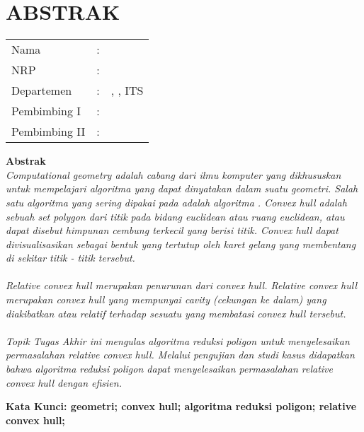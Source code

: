 \chapter {ABSTRAK}


\noindent\textbf{\MakeUppercase\judul}
\vspace*{1em}

\begin{tabularx}{\linewidth}{ l l p{2.2in} }
	Nama 			& : & \penulis \\
	NRP 			& :	& \nrp \\
	Departemen 		& : & \jurusan, \newline \fakultas, ITS \\
	Pembimbing I 	& : & \pembimbingsatu \\
	Pembimbing II 	& : & \pembimbingdua
	\vspace*{1em} 	%
\end {tabularx}

\noindent\textbf{Abstrak} \\
\itshape
\textit{Computational geometry} adalah cabang dari ilmu komputer yang dikhususkan untuk mempelajari algoritma yang dapat dinyatakan dalam suatu geometri. Salah satu algoritma yang sering dipakai pada \CG adalah algoritma \CH. \textit{Convex hull} adalah sebuah set polygon dari titik pada bidang \textit{euclidean} atau ruang \textit{euclidean}, atau dapat disebut himpunan cembung terkecil yang berisi titik. Convex hull dapat divisualisasikan sebagai bentuk yang tertutup oleh karet gelang yang membentang di sekitar titik - titik tersebut.\\\\
\textit{Relative convex hull} merupakan penurunan dari \textit{convex hull}. \textit{Relative convex hull} merupakan \textit{convex hull} yang mempunyai \textit{cavity} (cekungan ke dalam) yang diakibatkan atau relatif terhadap sesuatu yang membatasi \textit{convex hull} tersebut. \\\\
Topik Tugas Akhir ini mengulas algoritma reduksi poligon untuk menyelesaikan permasalahan \textit{relative convex hull}. Melalui pengujian dan studi kasus didapatkan bahwa algoritma reduksi poligon dapat menyelesaikan permasalahan \textit{relative convex hull} dengan efisien.

\vspace*{1em}
\noindent\bfseries Kata Kunci: geometri; convex hull; algoritma reduksi poligon; relative convex hull;
\normalfont
\cleardoublepage

